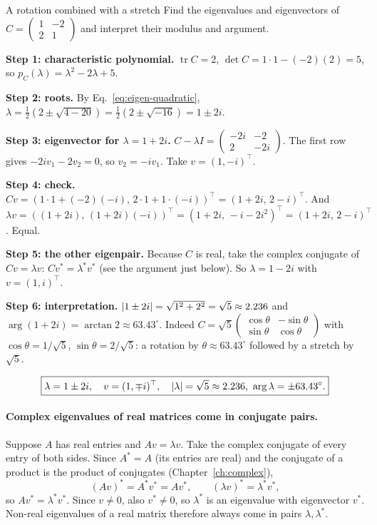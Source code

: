 \begin{sample}{A rotation combined with a stretch}
Find the eigenvalues and eigenvectors of $C=\begin{pmatrix}1&-2\\2&1\end{pmatrix}$ and interpret their modulus and argument.

\textbf{Step 1: characteristic polynomial.} $\operatorname{tr}C=2$, $\det C=1\cdot1-(-2)(2)=5$, so $p_C(\lambda)=\lambda^2-2\lambda+5$.

\textbf{Step 2: roots.} By Eq.~\eqref{eq:eigen-quadratic}, $\lambda=\tfrac12\left(2\pm\sqrt{4-20}\right)=\tfrac12(2\pm\sqrt{-16})=1\pm2i$.

\textbf{Step 3: eigenvector for $\lambda=1+2i$.} $C-\lambda I=\begin{pmatrix}-2i&-2\\2&-2i\end{pmatrix}$. The first row gives $-2iv_1-2v_2=0$, so $v_2=-iv_1$. Take $v=(1,-i)^\top$.

\textbf{Step 4: check.} $Cv=(1\cdot1+(-2)(-i),\,2\cdot1+1\cdot(-i))^\top=(1+2i,\,2-i)^\top$. And $\lambda v=((1+2i),\,(1+2i)(-i))^\top=(1+2i,\,-i-2i^2)^\top=(1+2i,\,2-i)^\top$. Equal.

\textbf{Step 5: the other eigenpair.} Because $C$ is real, take the complex conjugate of $Cv=\lambda v$: $Cv^*=\lambda^*v^*$ (see the argument just below). So $\lambda=1-2i$ with $v=(1,i)^\top$.

\textbf{Step 6: interpretation.} $\left\lvert 1\pm2i\right\rvert=\sqrt{1^2+2^2}=\sqrt5\approx2.236$ and $\arg(1+2i)=\arctan2\approx63.43^\circ$. Indeed $C=\sqrt5\begin{pmatrix}\cos\theta&-\sin\theta\\\sin\theta&\cos\theta\end{pmatrix}$ with $\cos\theta=1/\sqrt5$, $\sin\theta=2/\sqrt5$: a rotation by $\theta\approx63.43^\circ$ followed by a stretch by $\sqrt5$.

\[
\boxed{\lambda=1\pm2i,\quad v=(1,\mp i)^\top,\quad \abs{\lambda}=\sqrt5\approx2.236,\ \arg\lambda=\pm63.43^\circ.}
\]
\end{sample}

\paragraph{Complex eigenvalues of real matrices come in conjugate pairs.} Suppose $A$ has real entries and $Av=\lambda v$. Take the complex conjugate of every entry of both sides. Since $A^*=A$ (its entries are real) and the conjugate of a product is the product of conjugates (Chapter~\ref{ch:complex}),
\begin{equation}
(Av)^*=A^*v^*=Av^*,\qquad(\lambda v)^*=\lambda^*v^*,
\end{equation}
so $Av^*=\lambda^*v^*$. Since $v\ne0$, also $v^*\ne0$, so $\lambda^*$ is an eigenvalue with eigenvector $v^*$. Non-real eigenvalues of a real matrix therefore always come in pairs $\lambda,\lambda^*$.

